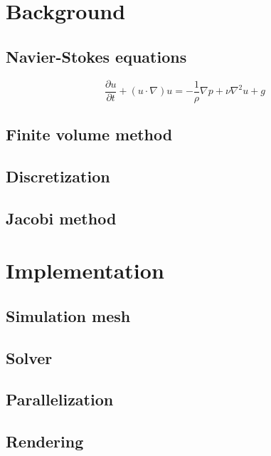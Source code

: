\documentclass[12pt]{article}
\begin{document}

\section{Background}

\subsection{Navier-Stokes equations}

\begin{equation}
  \frac{\partial u}{\partial t} + (u \cdot \nabla) u = -\frac{1}{\rho} \nabla p + \nu \nabla^2 u + g
\end{equation}

\subsection{Finite volume method}

\subsection{Discretization}

\subsection{Jacobi method}

\section{Implementation}

\subsection{Simulation mesh}

\subsection{Solver}

\subsection{Parallelization}

\subsection{Rendering}
\end{document}
